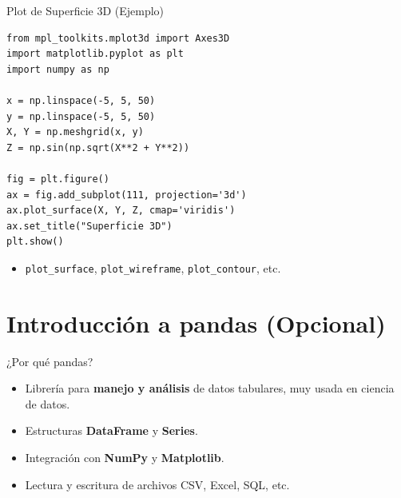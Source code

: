 \documentclass[10pt]{beamer}
\begin{document}
\begin{frame}[fragile]{Plot de Superficie 3D (Ejemplo)}
\begin{verbatim}
from mpl_toolkits.mplot3d import Axes3D
import matplotlib.pyplot as plt
import numpy as np

x = np.linspace(-5, 5, 50)
y = np.linspace(-5, 5, 50)
X, Y = np.meshgrid(x, y)
Z = np.sin(np.sqrt(X**2 + Y**2))

fig = plt.figure()
ax = fig.add_subplot(111, projection='3d')
ax.plot_surface(X, Y, Z, cmap='viridis')
ax.set_title("Superficie 3D")
plt.show()
\end{verbatim}
\begin{itemize}
  \item \texttt{plot\_surface}, \texttt{plot\_wireframe}, \texttt{plot\_contour}, etc.
\end{itemize}
\end{frame}

\section{Introducción a pandas (Opcional)}

\begin{frame}{¿Por qué pandas?}
  \begin{itemize}
    \item Librería para \textbf{manejo y análisis} de datos tabulares, muy usada en ciencia de datos.
    \item Estructuras \textbf{DataFrame} y \textbf{Series}.
    \item Integración con \textbf{NumPy} y \textbf{Matplotlib}.
    \item Lectura y escritura de archivos CSV, Excel, SQL, etc.
  \end{itemize}
\end{frame}
\end{document}
